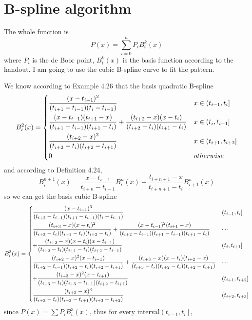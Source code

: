 \documentclass[]{article}
\begin{document}
\section{B-spline algorithm}
The whole function is $$
    P(x) = \sum_{i=0}^n P_i B_i^k(x)
   	$$
where $P_i$ is the de Boor point, $B_i^k(x)$ is the basis function according to the handout. 
I am going to use the cubic B-spline curve to fit the pattern.\par
We know according to Example 4.26 that the basis quadratic B-spline $$
	B_i^2(x) = \begin{dcases}
	\frac{(x-t_{i-1})^2}{(t_{i+1}-t_{i-1})(t_i - t_{i-1})} & x\in \left(t_{i-1},t_i\right] \\
	\frac{(x-t_{i-1})(t_{i+1}-x)}{(t_{i+1}-t_{i-1})(t_{i+1}-t_i)} + \frac{(t_{i+2}-x)(x-t_i)}{(t_{i+2}-t_i)(t_{i+1}-t_i)} & x\in \left(t_i,t_{i+1}\right] \\
	\frac{(t_{i+2}-x)^2}{(t_{i+2}-t_i)(t_{i+2}-t_{i+1})} & x\in \left(t_{i+1},t_{i+2} \right] \\
	0 & otherwise
	\end{dcases}
$$
and according to Definition 4.24, $$
	B_i^{n+1}(x) = \frac{x-t_{i-1}}{t_{i+n}-t_{i-1}}B_i^n(x) + \frac{t_{i+n+1} - x}{t_{i+n+1}-t_i} B_{i+1}^n(x)
$$
so we can get the basis cubic B-spline $$
	B_i^3(x) = \begin{dcases}
	\frac{(x-t_{i-1})^3}{(t_{i+2}-t_{i-1})(t_{i+1}-t_{i-1})(t_i-t_{i-1})} & \left(t_{i-1},t_i\right] \\
	\frac{(t_{i+3}-x)(x-t_{i})^2}{(t_{i+3}-t_i)(t_{i+1}-t_{i})(t_{i+2}-t_{i})} + \frac{(x-t_{i-1})^2(t_{i+1}-x)}{(t_{i+2}-t_{i-1})(t_{i+1}-t_{i-1})(t_{i+1}-t_i)} & \cdots \\ 
	 + \frac{(t_{i+2}-x)(x-t_i)(x-t_{i-1})}{(t_{i+2}-t_i)(t_{i+1}-t_i)(t_{i+2}-t_{i-1})} & \left(t_i,t_{i+1} \right] \\
	\frac{(t_{i+2}-x)^2(x-t_{i-1})}{(t_{i+2}-t_{i-1})(t_{i+2}-t_i)(t_{i+2}-t_{i+1})} + \frac{(t_{i+3}-x)(x-t_{i})(t_{i+2}-x)}{(t_{i+3}-t_i)(t_{i+2}-t_{i})(t_{i+2}-t_{i+1})} & \cdots\\
	+\frac{(t_{i+3}-x)^2(x-t_{i+1})}{(t_{i+3}-t_i)(t_{i+3}-t_{i+1})(t_{i+2}-t_{i+1})} & \left(t_{i+1},t_{i+2} \right] \\
	\frac{(t_{i+3}-x)^3}{(t_{i+3}-t_i)(t_{i+3}-t_{i+1})(t_{i+3}-t_{i+2})} & \left(t_{i+2},t_{i+3} \right]
	\end{dcases}
$$
since $\displaystyle P(x) = \sum P_iB_i^3(x) $, thus for every interval$\displaystyle\left(t_{i-1},t_i\right]$,
\end{document}
